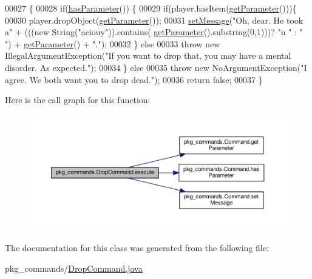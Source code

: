 \begin{DoxyCode}
00027                                                                                               \{
00028         \textcolor{keywordflow}{if}(\hyperlink{classpkg__commands_1_1Command_a02af95ab3f1898a66259ab7c177b6998}{hasParameter}()) \{
00029             \textcolor{keywordflow}{if}(player.hasItem(\hyperlink{classpkg__commands_1_1Command_a41c92d445be73ea9d62320c65efb8434}{getParameter}()))\{
00030                 player.dropObject(\hyperlink{classpkg__commands_1_1Command_a41c92d445be73ea9d62320c65efb8434}{getParameter}());
00031                 \hyperlink{classpkg__commands_1_1Command_ae210ff216fe908b111ba1c988a963d13}{setMessage}(\textcolor{stringliteral}{"Oh, dear. He took a"} + (((\textcolor{keyword}{new} String(\textcolor{stringliteral}{"aeiouy"})).contains(
      \hyperlink{classpkg__commands_1_1Command_a41c92d445be73ea9d62320c65efb8434}{getParameter}().substring(0,1)))? \textcolor{stringliteral}{"n "} : \textcolor{stringliteral}{" "}) + \hyperlink{classpkg__commands_1_1Command_a41c92d445be73ea9d62320c65efb8434}{getParameter}() + \textcolor{stringliteral}{"."});
00032             \} \textcolor{keywordflow}{else}
00033                 \textcolor{keywordflow}{throw} \textcolor{keyword}{new} IllegalArgumentException(\textcolor{stringliteral}{"If you want to drop that, you may have a mental
       disorder. As expected."});
00034         \} \textcolor{keywordflow}{else}
00035             \textcolor{keywordflow}{throw} \textcolor{keyword}{new} NoArgumentException(\textcolor{stringliteral}{"I agree. We both want you to drop dead."});
00036         \textcolor{keywordflow}{return} \textcolor{keyword}{false};
00037     \}
\end{DoxyCode}


Here is the call graph for this function\-:
\nopagebreak
\begin{figure}[H]
\begin{center}
\leavevmode
\includegraphics[width=350pt]{classpkg__commands_1_1DropCommand_a742e37b2d2dd4e111130811ee2f4dd0b_cgraph}
\end{center}
\end{figure}




The documentation for this class was generated from the following file\-:\begin{DoxyCompactItemize}
\item 
pkg\-\_\-commands/\hyperlink{DropCommand_8java}{Drop\-Command.\-java}\end{DoxyCompactItemize}
